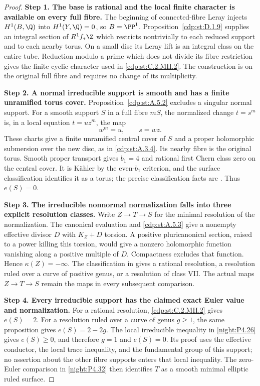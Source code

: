 \begin{proof}
\noindent\textbf{Step 1. The base is rational and the local
finite character is available on every full fibre.}
The beginning of connected-fibre Leray injects
$H^1(B,\Q)$ into $H^1(Y,\Q)=0$, so $B=\PP^1$.
Proposition~\ref{cdp:st:D.1.9} supplies an integral section
of $R^1f_*\Z$ which restricts nontrivially to each reduced
support and to each nearby torus. On a small disc its
Leray lift is an integral class on the entire tube.
Reduction modulo a prime which does not divide its fibre
restriction gives the finite cyclic character used in
\ref{cdp:st:C.2.MH.2}. The construction is on the original
full fibre and requires no change of its multiplicity.

\medskip\noindent\textbf{Step 2. A normal irreducible support
is smooth and has a finite unramified torus cover.}
Proposition~\ref{cdp:st:A.5.2} excludes a singular normal
support. For a smooth support $S$ in a full fibre $mS$,
the normalized change $t=s^m$ is, in a local equation
$t=uz^m$, the map
\[
 w^m=u,\qquad s=wz.
\]
These charts give a finite unramified central cover of $S$
and a proper holomorphic submersion over the new disc,
as in \ref{cdp:st:A.3.4}. Its nearby fibre is the
original torus. Smooth proper transport gives $b_1=4$
and rational first Chern class zero on the central cover.
It is K\"ahler by the even-$b_1$ criterion, and the
surface classification identifies it as a torus; the
precise classification facts are
\cite[Proposition~2.1 and Theorem~2.2, pp.~842--843]{Peters2021}.
Thus $e(S)=0$.

\medskip\noindent\textbf{Step 3. The irreducible nonnormal
normalization falls into three explicit resolution classes.}
Write $Z\to T\to S$ for the minimal resolution of the
normalization. The canonical evaluation and
\ref{cdp:st:A.5.3} give a nonempty effective divisor $D$
with $K_Z+D$ torsion. A positive pluricanonical section,
raised to a power killing this torsion, would give a
nonzero holomorphic function vanishing along a positive
multiple of $D$. Compactness excludes that function.
Hence $\kappa(Z)=-\infty$. The classification in
\cite[Theorem~2.2, p.~843]{Peters2021} gives a rational
resolution, a resolution ruled over a curve of positive
genus, or a resolution of class VII. The actual maps
$Z\to T\to S$ remain the maps in every subsequent
comparison.

\medskip\noindent\textbf{Step 4. Every irreducible support has
the claimed exact Euler value and normalization.}
For a rational resolution,
\ref{cdp:st:C.2.MH.2} gives $e(S)=2$. For a resolution
ruled over a curve of genus $g\ge1$, the same proposition
gives $e(S)=2-2g$. The local irreducible inequality in
\ref{night:P4.26} gives $e(S)\ge0$, and therefore $g=1$
and $e(S)=0$. Its proof uses the effective conductor,
the local trace inequality, and the fundamental group
of this support; no assertion about the other fibre
supports enters that local inequality. The zero-Euler
comparison in \ref{night:P4.32} then identifies $T$ as
a smooth minimal elliptic ruled surface.


\end{proof}
